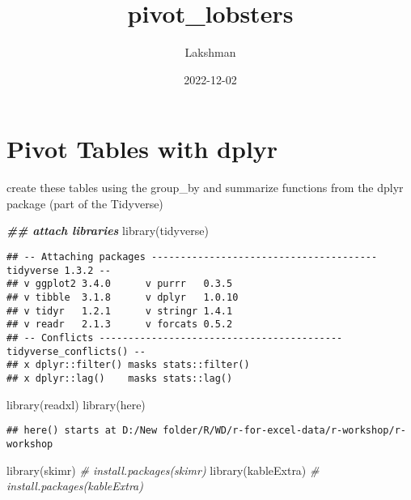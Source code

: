 \documentclass[
]{article}
\title{pivot\_lobsters}
\author{Lakshman}
\date{2022-12-02}
\newenvironment{Shaded}{\begin{snugshade}}{\end{snugshade}}
\newcommand{\CommentTok}[1]{\textcolor[rgb]{0.56,0.35,0.01}{\textit{#1}}}
\newcommand{\DocumentationTok}[1]{\textcolor[rgb]{0.56,0.35,0.01}{\textbf{\textit{#1}}}}
\newcommand{\FunctionTok}[1]{\textcolor[rgb]{0.00,0.00,0.00}{#1}}
\newcommand{\NormalTok}[1]{#1}
\begin{document}
\maketitle

\hypertarget{pivot-tables-with-dplyr}{%
\section{Pivot Tables with dplyr}\label{pivot-tables-with-dplyr}}

create these tables using the group\_by and summarize functions from the
dplyr package (part of the Tidyverse)

\begin{Shaded}
\begin{Highlighting}[]
\DocumentationTok{\#\# attach libraries}
\FunctionTok{library}\NormalTok{(tidyverse)}
\end{Highlighting}
\end{Shaded}

\begin{verbatim}
## -- Attaching packages --------------------------------------- tidyverse 1.3.2 --
## v ggplot2 3.4.0      v purrr   0.3.5 
## v tibble  3.1.8      v dplyr   1.0.10
## v tidyr   1.2.1      v stringr 1.4.1 
## v readr   2.1.3      v forcats 0.5.2 
## -- Conflicts ------------------------------------------ tidyverse_conflicts() --
## x dplyr::filter() masks stats::filter()
## x dplyr::lag()    masks stats::lag()
\end{verbatim}

\begin{Shaded}
\begin{Highlighting}[]
\FunctionTok{library}\NormalTok{(readxl)}
\FunctionTok{library}\NormalTok{(here)}
\end{Highlighting}
\end{Shaded}

\begin{verbatim}
## here() starts at D:/New folder/R/WD/r-for-excel-data/r-workshop/r-workshop
\end{verbatim}

\begin{Shaded}
\begin{Highlighting}[]
\FunctionTok{library}\NormalTok{(skimr) }\CommentTok{\# install.packages(\textquotesingle{}skimr\textquotesingle{})}
\FunctionTok{library}\NormalTok{(kableExtra) }\CommentTok{\# install.packages(\textquotesingle{}kableExtra\textquotesingle{})}
\end{Highlighting}
\end{Shaded}
\end{document}
